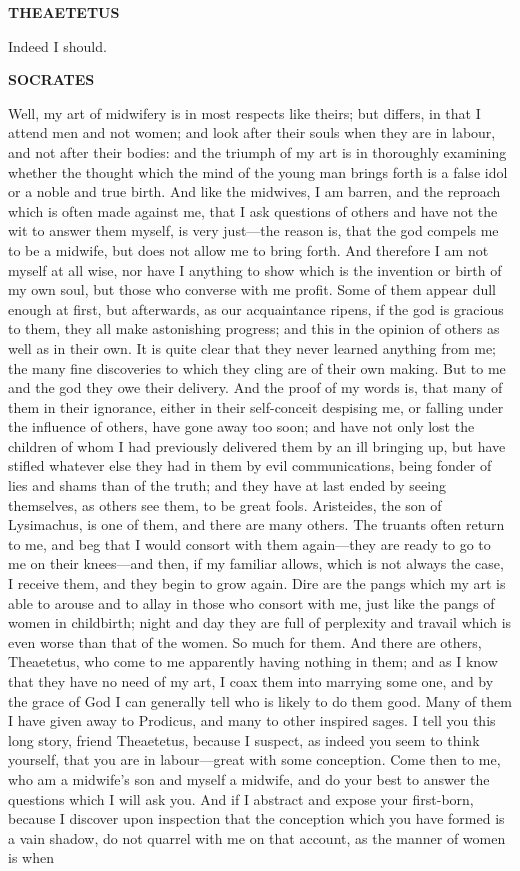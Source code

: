 \documentclass[11pt,letter]{article}
\begin{document}
\par \textbf{THEAETETUS}
\par   Indeed I should.

\par \textbf{SOCRATES}
\par   Well, my art of midwifery is in most respects like theirs; but differs, in that I attend men and not women; and look after their souls when they are in labour, and not after their bodies:  and the triumph of my art is in thoroughly examining whether the thought which the mind of the young man brings forth is a false idol or a noble and true birth. And like the midwives, I am barren, and the reproach which is often made against me, that I ask questions of others and have not the wit to answer them myself, is very just—the reason is, that the god compels me to be a midwife, but does not allow me to bring forth. And therefore I am not myself at all wise, nor have I anything to show which is the invention or birth of my own soul, but those who converse with me profit. Some of them appear dull enough at first, but afterwards, as our acquaintance ripens, if the god is gracious to them, they all make astonishing progress; and this in the opinion of others as well as in their own. It is quite clear that they never learned anything from me; the many fine discoveries to which they cling are of their own making. But to me and the god they owe their delivery. And the proof of my words is, that many of them in their ignorance, either in their self-conceit despising me, or falling under the influence of others, have gone away too soon; and have not only lost the children of whom I had previously delivered them by an ill bringing up, but have stifled whatever else they had in them by evil communications, being fonder of lies and shams than of the truth; and they have at last ended by seeing themselves, as others see them, to be great fools. Aristeides, the son of Lysimachus, is one of them, and there are many others. The truants often return to me, and beg that I would consort with them again—they are ready to go to me on their knees—and then, if my familiar allows, which is not always the case, I receive them, and they begin to grow again. Dire are the pangs which my art is able to arouse and to allay in those who consort with me, just like the pangs of women in childbirth; night and day they are full of perplexity and travail which is even worse than that of the women. So much for them. And there are others, Theaetetus, who come to me apparently having nothing in them; and as I know that they have no need of my art, I coax them into marrying some one, and by the grace of God I can generally tell who is likely to do them good. Many of them I have given away to Prodicus, and many to other inspired sages. I tell you this long story, friend Theaetetus, because I suspect, as indeed you seem to think yourself, that you are in labour—great with some conception. Come then to me, who am a midwife's son and myself a midwife, and do your best to answer the questions which I will ask you. And if I abstract and expose your first-born, because I discover upon inspection that the conception which you have formed is a vain shadow, do not quarrel with me on that account, as the manner of women is when 
\end{document}
